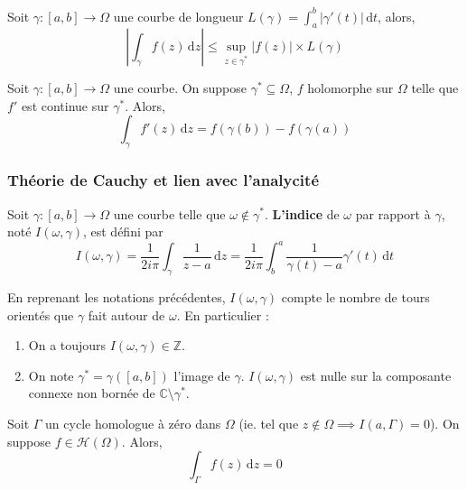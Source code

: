   \begin{proposition}
    Soit $\gamma : [a,b] \rightarrow \Omega$ une courbe de longueur $L(\gamma) = \int_{a}^{b} \vert \gamma'(t) \vert \, \mathrm{d}t$, alors,
    \[ \left\vert \int_\gamma f(z) \, \mathrm{d}z \right\vert \leq \sup_{z \in \gamma^*} \vert f(z) \vert \times L(\gamma) \]
  \end{proposition}

  \begin{proposition}
    Soit $\gamma : [a,b] \rightarrow \Omega$ une courbe. On suppose $\gamma^* \subseteq \Omega$, $f$ holomorphe sur $\Omega$ telle que $f'$ est continue sur $\gamma^*$. Alors,
    \[ \int_\gamma f'(z) \, \mathrm{d}z = f(\gamma(b)) - f(\gamma(a)) \]
  \end{proposition}

  \subsubsection{Théorie de Cauchy et lien avec l'analycité}

  \begin{definition}
    Soit $\gamma : [a,b] \rightarrow \Omega$ une courbe telle que $\omega \notin \gamma^*$. \textbf{L'indice} de $\omega$ par rapport à $\gamma$, noté $I(\omega, \gamma)$, est défini par
    \[ I(\omega, \gamma) = \frac{1}{2i\pi} \int_\gamma \frac{1}{z-a} \, \mathrm{d}z = \frac{1}{2i\pi} \int_b^a \frac{1}{\gamma(t)-a} \gamma'(t) \, \mathrm{d}t \]
  \end{definition}

  \begin{remark}
    En reprenant les notations précédentes, $I(\omega, \gamma)$ compte le nombre de tours orientés que $\gamma$ fait autour de $\omega$. En particulier :
    \begin{enumerate}[label=(\roman*)]
      \item On a toujours $I(\omega, \gamma) \in \mathbb{Z}$.
      \item On note $\gamma^* = \gamma([a,b])$ l'image de $\gamma$. $I(\omega, \gamma)$ est nulle sur la composante connexe non bornée de $\mathbb{C} \setminus \gamma^*$.
    \end{enumerate}
  \end{remark}


  \begin{theorem}
    Soit $\Gamma$ un cycle homologue à zéro dans $\Omega$ (ie. tel que $z \notin \Omega \implies I(a, \Gamma) = 0$). On suppose $f \in \mathcal{H}(\Omega)$. Alors,
    \[ \int_\Gamma f(z) \, \mathrm{d}z = 0 \]
  \end{theorem}

